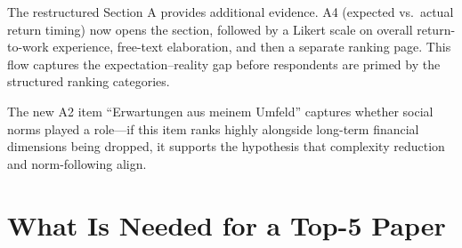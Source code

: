 \documentclass[12pt,a4paper]{article}
\begin{document}
The restructured Section A provides additional evidence. A4 (expected vs.\ actual return timing) now opens the section, followed by a Likert scale on overall return-to-work experience, free-text elaboration, and then a separate ranking page. This flow captures the expectation--reality gap before respondents are primed by the structured ranking categories.

The new A2 item ``Erwartungen aus meinem Umfeld'' captures whether social norms played a role---if this item ranks highly alongside long-term financial dimensions being dropped, it supports the hypothesis that complexity reduction and norm-following align.

\section{What Is Needed for a Top-5 Paper}
\end{document}

